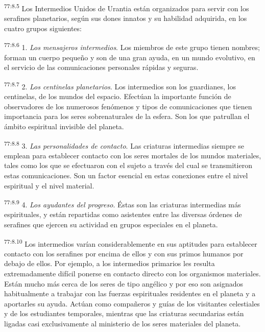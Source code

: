 \par
\textsuperscript{77:8.5} Los Intermedios Unidos de Urantia están organizados para servir con los serafines planetarios, según sus dones innatos y su habilidad adquirida, en los cuatro grupos siguientes:

\par
\textsuperscript{77:8.6} 1. \textit{Los mensajeros intermedios}. Los miembros de este grupo tienen nombres; forman un cuerpo pequeño y son de una gran ayuda, en un mundo evolutivo, en el servicio de las comunicaciones personales rápidas y seguras.

\par
\textsuperscript{77:8.7} 2. \textit{Los centinelas planetarios}. Los intermedios son los guardianes, los centinelas, de los mundos del espacio. Efectúan la importante función de observadores de los numerosos fenómenos y tipos de comunicaciones que tienen importancia para los seres sobrenaturales de la esfera. Son los que patrullan el ámbito espiritual invisible del planeta.

\par
\textsuperscript{77:8.8} 3. \textit{Las personalidades de contacto}. Las criaturas intermedias siempre se emplean para establecer contacto con los seres mortales de los mundos materiales, tales como los que se efectuaron con el sujeto a través del cual se transmitieron estas comunicaciones. Son un factor esencial en estas conexiones entre el nivel espiritual y el nivel material.

\par
\textsuperscript{77:8.9} 4. \textit{Los ayudantes del progreso}. Éstas son las criaturas intermedias más espirituales, y están repartidas como asistentes entre las diversas órdenes de serafines que ejercen su actividad en grupos especiales en el planeta.

\par
\textsuperscript{77:8.10} Los intermedios varían considerablemente en sus aptitudes para establecer contacto con los serafines por encima de ellos y con sus primos humanos por debajo de ellos. Por ejemplo, a los intermedios primarios les resulta extremadamente difícil ponerse en contacto directo con los organismos materiales. Están mucho más cerca de los seres de tipo angélico y por eso son asignados habitualmente a trabajar con las fuerzas espirituales residentes en el planeta y a aportarles su ayuda. Actúan como compañeros y guías de los visitantes celestiales y de los estudiantes temporales, mientras que las criaturas secundarias están ligadas casi exclusivamente al ministerio de los seres materiales del planeta.

